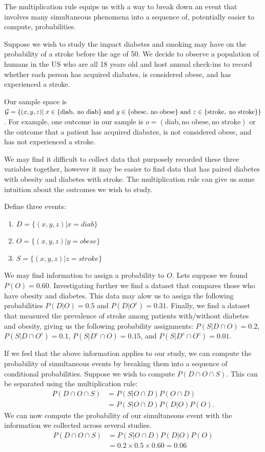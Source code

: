 The multiplication rule equips us with a way to break down an event that involves many simultaneous phenomena into a sequence of, potentially easier to compute, probabilities.  

\ex Suppose we wish to study the impact diabetes and smoking may have on the probability of a stroke before the age of 50. We decide to observe a population of humans in the US who are all 18 years old and host annual check-ins to record whether each person has acquired diabates, is considered obese, and has experienced a stroke.

Our sample space is $\mathcal{G} = \{ (x,y,z) |\;x \in \{\text{diab}, \;\text{no diab}\} \text{ and } y \in \{\text{obese},\; \text{no obese}\} \text{ and } z \in \{\text{stroke},\; \text{no stroke}\} \}$. For example, one outcome in our sample is $o = (\text{diab},\text{no obese},\text{no stroke})$ or the outcome that a patient has acquired diabates, is not considered obese, and has not experienced a stroke.

We may find it difficult to collect data that purposely recorded these three variables together, however it may be easier to find data that has paired diabetes with obesity and diabetes with stroke. 
The multiplication rule can give us some intuition about the outcomes we wish to study.

Define three events:
\begin{enumerate}
  \item $D = \{ (x,y,z) | x=diab\}$
  \item $O = \{ (x,y,z) | y=obese\}$
  \item $S = \{ (x,y,z) | z=stroke\}$
\end{enumerate}

We may find information to assign a probability to $O$. Lets suppose we found $P(O) = 0.60$. 
Investigating further we find a dataset that compares those who have obesity and diabetes. This data may alow us to assign the following probabilities $P(D|O) = 0.5$ and $P(D|O^{c}) = 0.31$.
Finally, we find a dataset that measured the prevalence of stroke among patients with/without  diabetes and obesity, giving us the following probability assignments: $P(S|D \cap O) = 0.2$, $P(S|D \cap O^{c}) = 0.1$, $P(S|D^{c} \cap O) = 0.15$, and $P(S|D^{c} \cap O^{c}) = 0.01$.

If we feel that the above information applies to our study, we can compute the probability of simultaneous events by breaking them into a sequence of conditional probabilities. 
Suppose we wish to compute $P(D \cap O \cap S)$. 
This can be separated using the multiplication rule:
\begin{align}
    P(D \cap O \cap S) &= P(S | O \cap D ) P(O \cap D)\\
    &=P(S| O \cap D) P(D | O) P(O) . 
\end{align}
We can now compute the probability of our simultaneous event with the information we collected across several studies. 
\begin{align}
    P(D \cap O \cap S)  &= P(S| O \cap D) P(D | O) P(O)\\
   &= 0.2 \times 0.5 \times 0.60  = 0.06
\end{align}

